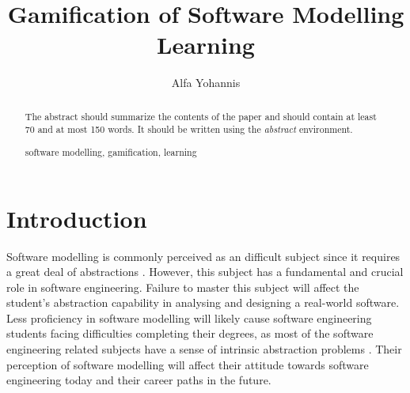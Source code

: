 \documentclass[runningheads,a4paper]{llncs}
\newcommand{\keywords}[1]{\par\addvspace\baselineskip
\noindent\keywordname\enspace\ignorespaces#1}
\begin{document}
\mainmatter  %

\title{Gamification of Software Modelling Learning}


%
%
\author{Alfa Yohannis}
%


%
%

\maketitle


\begin{abstract}
The abstract should summarize the contents of the paper and should
contain at least 70 and at most 150 words. It should be written using the
\emph{abstract} environment.
\keywords{software modelling, gamification, learning}
\end{abstract}


\section{Introduction}
Software modelling is commonly perceived as an difficult subject since it requires a great deal of abstractions \cite{Borstler2012}. However, this subject has a fundamental and crucial role in software engineering. Failure to master this subject will affect the student’s abstraction capability in analysing and designing a real-world software. Less proficiency in software modelling will likely cause software engineering students facing difficulties completing their degrees, as most of the software engineering related subjects have a sense of intrinsic abstraction problems \cite{Kramer2007}. Their perception of software modelling will affect their attitude towards software engineering today and their career paths in the future.
\end{document}
